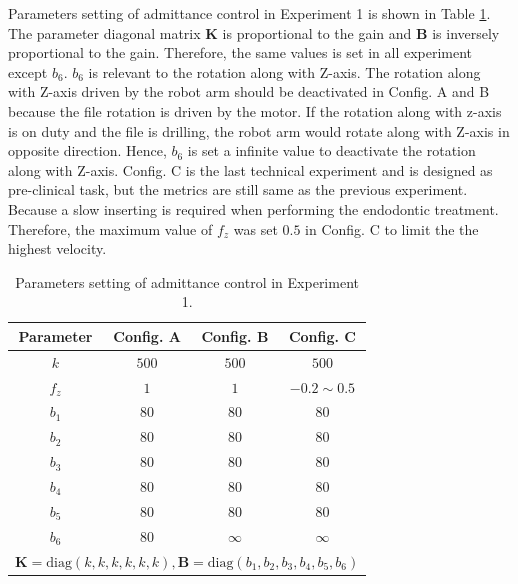 \par
Parameters setting of admittance control in Experiment 1 is shown in Table \ref{tab: para_adm_exp1}. The parameter diagonal matrix $\mathbf{K}$ is proportional to the gain and $\mathbf{B}$ is inversely proportional to the gain. Therefore, the same values is set in all experiment except $b_6$. $b_6$ is relevant to the rotation along with Z-axis. The rotation along with Z-axis driven by the robot arm should be deactivated in Config. A and B because the file rotation is driven by the motor. If the rotation along with z-axis is on duty and the file is drilling, the robot arm would rotate along with Z-axis in opposite direction. Hence, $b_6$ is set a infinite value to deactivate the rotation along with Z-axis. Config. C is the last technical experiment and is designed as pre-clinical task, but the metrics are still same as the previous experiment. Because a slow inserting is required when performing the endodontic treatment. Therefore, the maximum value of $f_z$ was set $0.5$ in Config. C to limit the the highest velocity. 
\par
\begin{table}[htbp]
\centering
\tabcolsep=22pt
\caption{Parameters setting of admittance control in Experiment 1.}
\label{tab: para_adm_exp1}
\begin{tabular}{cccc} 
\hline \hline
Parameter	&Config. A	&Config. B	&Config. C			\\
\hline
$k$			&$500$		&$500$		&$500$				\\
$f_z$		&$1$		&$1$		&$-0.2 \sim 0.5$	\\
$b_1$		&$80$		&$80$		&$80$				\\
$b_2$		&$80$		&$80$		&$80$				\\
$b_3$		&$80$		&$80$		&$80$				\\
$b_4$		&$80$		&$80$		&$80$				\\
$b_5$		&$80$		&$80$		&$80$				\\
$b_6$		&$80$		&$\infty$	&$\infty$			\\
\hline
\multicolumn{4}{c}{ $\mathbf{K} = \text{diag}(k,k,k,k,k,k), \mathbf{B} = \text{diag}(b_1,b_2,b_3,b_4,b_5,b_6)$} \\
\hline\hline	
\end{tabular}
\end{table}
